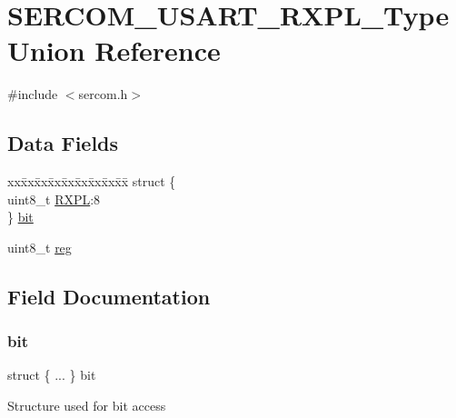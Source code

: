 \hypertarget{union_s_e_r_c_o_m___u_s_a_r_t___r_x_p_l___type}{}\section{S\+E\+R\+C\+O\+M\+\_\+\+U\+S\+A\+R\+T\+\_\+\+R\+X\+P\+L\+\_\+\+Type Union Reference}
\label{union_s_e_r_c_o_m___u_s_a_r_t___r_x_p_l___type}


{\ttfamily \#include $<$sercom.\+h$>$}

\subsection*{Data Fields}
\begin{DoxyCompactItemize}
\item 
\begin{tabbing}
xx\=xx\=xx\=xx\=xx\=xx\=xx\=xx\=xx\=\kill
struct \{\\
\>uint8\_t \mbox{\hyperlink{union_s_e_r_c_o_m___u_s_a_r_t___r_x_p_l___type_a2cdf3163c77203c3e8e2d4aa160ca227}{RXPL}}:8\\
\} \mbox{\hyperlink{union_s_e_r_c_o_m___u_s_a_r_t___r_x_p_l___type_a6b3dbff44ef5e45df567f78cbcc443c5}{bit}}\\

\end{tabbing}\item 
uint8\+\_\+t \mbox{\hyperlink{union_s_e_r_c_o_m___u_s_a_r_t___r_x_p_l___type_a9428adc9af4653a2050e2536b55dec8d}{reg}}
\end{DoxyCompactItemize}


\subsection{Field Documentation}
\mbox{\label{union_s_e_r_c_o_m___u_s_a_r_t___r_x_p_l___type_a6b3dbff44ef5e45df567f78cbcc443c5}} 
\subsubsection{\texorpdfstring{bit}{bit}}
{\footnotesize\ttfamily struct \{ ... \}   bit}

Structure used for bit access \mbox{\label{union_s_e_r_c_o_m___u_s_a_r_t___r_x_p_l___type_a9428adc9af4653a2050e2536b55dec8d}} 
